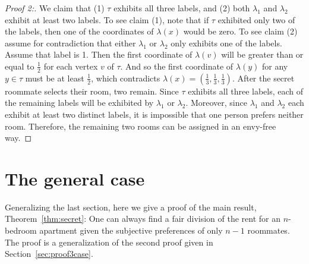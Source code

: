\documentclass[a4paper,10pt,reqno, english]{amsart}
\theoremstyle{plain}
\theoremstyle{definition}
\begin{document}
\begin{proof}[Proof 2:]
	We claim that (1) $\tau$ exhibits all three labels, and (2) both $\lambda_1$ and $\lambda_2$ exhibit at least two labels. To see claim (1), note that if $\tau$ exhibited only two of the labels, then one of the coordinates of $\lambda(x)$ would be zero. To see claim (2) assume for contradiction that either $\lambda_1$ or $\lambda_2$ only exhibits one of the labels. Assume that label is 1. Then the first coordinate of $\lambda(v)$ will be greater than or equal to $\frac{1}{2}$ for each vertex $v$ of $\tau$. And so the first coordinate of $\lambda(y)$ for any $y\in \tau$ must be at least $\frac{1}{2}$, which contradicts $\lambda(x) = (\frac13,\frac13,\frac13)$. After the secret roommate selects their room, two remain. Since $\tau$ exhibits all three labels, each of the remaining labels will be exhibited by $\lambda_1$ or $\lambda_2$. Moreover, since $\lambda_1$ and $\lambda_2$ each exhibit at least two distinct labels, it is impossible that one person prefers neither room. Therefore, the remaining two rooms can be assigned in an envy-free way.
\end{proof}






\section{The general case}
\label{sec:general}

Generalizing the last section, here we give a proof of the main result, Theorem~\ref{thm:secret}: One can always find a fair division of the rent for an $n$-bedroom apartment given the subjective preferences of only $n-1$ roommates. The proof is a generalization of the second proof given in Section~\ref{sec:proof3case}.
\end{document}
